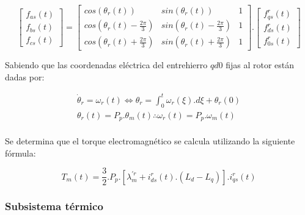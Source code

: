 \documentclass{article}
\begin{document}
    \begin{equation}\label{eq:transformacion_de_park_inversa}
        \begin{bmatrix}
            f_{as}(t)\\
            f_{bs}(t)\\
            f_{cs}(t)
        \end{bmatrix}
        =
        \begin{bmatrix}
            cos(\theta_r(t)) & sin(\theta_r(t)) & 1\\
            cos(\theta_r(t) - \frac{2\pi}{3}) & sin(\theta_r(t) - \frac{2\pi}{3}) & 1\\
            cos(\theta_r(t) + \frac{2\pi}{3}) & sin(\theta_r(t) + \frac{2\pi}{3}) & 1
        \end{bmatrix}.
        \begin{bmatrix}
            f_{qs}^r(t)\\
            f_{ds}^r(t)\\
            f_{0s}^r(t)
        \end{bmatrix}
    \end{equation}

    Sabiendo que las coordenadas eléctrica del entrehierro $qd0$ fijas al rotor están dadas por:

    \begin{equation}\label{eq.coordenadas_fijas_al_rotor}
        \begin{aligned}
            \dot{\theta}_r = \omega_r(t) \Leftrightarrow  \theta_r = \int_0^t \omega_r(\xi).d\xi + \theta_r(0)\\
            \theta_r(t) = P_p.\theta_m(t) \therefore \omega_r(t) = P_p.\omega_m(t)\\
        \end{aligned}
    \end{equation}

    Se determina que el torque electromagnético se calcula utilizando la siguiente fórmula:

    \begin{equation}\label{eq.torque_electromagnetico}
        T_{m}(t) = \frac{3}{2}.P_{p}.[\lambda_{m}^{\prime r}+i_{ds}^r(t).(L_{d}-L_{q})].i_{qs}^r(t)
    \end{equation}
        
    \subsubsection{Subsistema térmico} 
    
\end{document}
